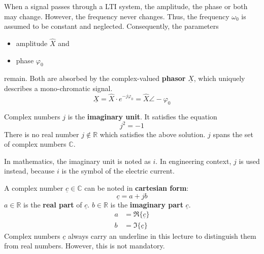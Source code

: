 \begin{refsection}
When a signal passes through a \ac{LTI} system, the amplitude, the phase or both may change. However, the frequency never changes. Thus, the frequency $\omega_0$ is assumed to be constant and neglected. Consequently, the parameters
\begin{itemize}
	\item amplitude $\hat{X}$ and
	\item phase $\varphi_0$
\end{itemize}
remain. Both are absorbed by the complex-valued  \textbf{phasor} $\underline{X}$, which uniquely describes a mono-chromatic signal.
\begin{equation}
	\underline{X} = \hat{X} \cdot e^{-j \varphi_0} = \hat{X} \angle -\varphi_0
\end{equation}%

\begin{excursus}{Complex numbers}
	$j$ is the  \textbf{imaginary unit}. It satisfies the equation
	\begin{equation}
		j^2 = -1
	\end{equation}%
	There is no real number $j \notin \mathbb{R}$ which satisfies the above solution. $j$ spans the set of complex numbers $\mathbb{C}$.
	
	In mathematics, the imaginary unit is noted as $i$. In engineering context, $j$ is used instead, because $i$ is the symbol of the electric current.
	
	A complex number $\underline{c} \in \mathbb{C}$ can be noted in  \textbf{cartesian form}:
	\begin{equation}
		\underline{c} = a + j b
	\end{equation}
	$a \in \mathbb{R}$ is the  \textbf{real part} of $\underline{c}$. $b \in \mathbb{R}$ is the  \textbf{imaginary part} $\underline{c}$.
	\begin{subequations}
		\begin{align}
			a &= \Re\{\underline{c}\} \\
			b &= \Im\{\underline{c}\}
		\end{align}
	\end{subequations}%
	Complex numbers $\underline{c}$ always carry an underline in this lecture to distinguish them from real numbers. However, this is not mandatory.


\end{excursus}
\end{refsection}

